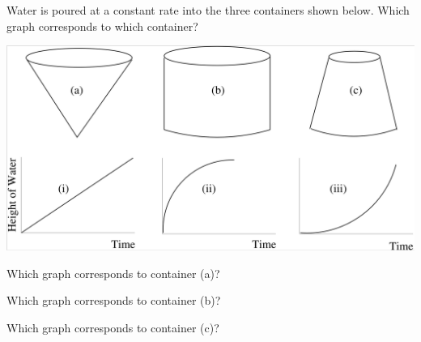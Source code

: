 \documentclass{ximera}
\author{Vic Ferdinand, Betsy McNeal, Jenny Sheldon}
\begin{document}
\begin{exercise}
Water is poured at a constant rate into the three containers shown
below. Which graph corresponds to which container?


\begin{image}
\includegraphics[width=\textwidth]{GraphicDetails2.png}
\end{image}

Which graph corresponds to container (a)?
\begin{multipleChoice}
\end{multipleChoice}


Which graph corresponds to container (b)?
\begin{multipleChoice}
\end{multipleChoice}


Which graph corresponds to container (c)?
\begin{multipleChoice}
\end{multipleChoice}

\end{exercise}
\end{document}
